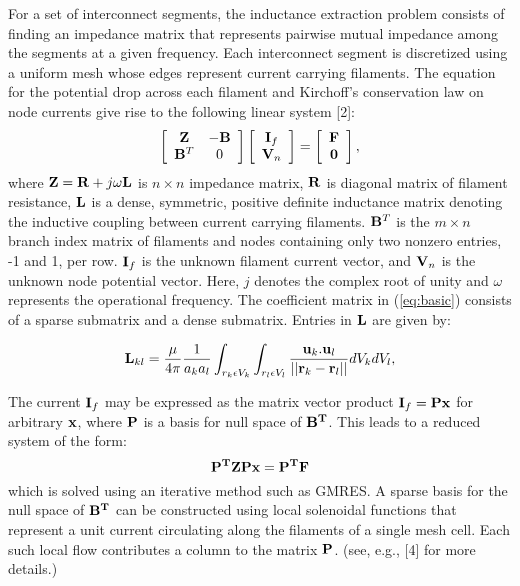 \documentclass{report}
\begin{document}
For a set of interconnect segments, the inductance extraction problem
consists of finding an impedance matrix that represents pairwise mutual
impedance among the segments at a given frequency. Each interconnect
segment is discretized using a uniform mesh whose edges represent current
carrying filaments. The equation for the potential drop across each
filament and Kirchoff's conservation law on node currents give rise to
the following linear system [2]:
\begin{equation}
\label{eq:basic}
\left[\begin{array}
{c c} {\bf Z} & -{\bf B}\\
{\bf B}^{T} & 0 \end{array} \right ]
\left[\begin{array}
{c}{\bf I}_f \\ {\bf V}_n
\end{array}
\right]
=
\left[\begin{array}
{c}{\bf F} \\
{\bf 0}
\end{array}
\right] ,
\end{equation}
where ${\bf Z} = {\bf R} + j\omega{\bf L}$ is $n \times n$ impedance
matrix, ${\bf R}$ is diagonal matrix of filament resistance, ${\bf L}$ is
a dense, symmetric, positive definite inductance matrix denoting the
inductive coupling between current carrying filaments. ${\bf B}^T$ is the
$m \times n$ branch index matrix of filaments and nodes containing only
two nonzero entries, -1 and 1, per row. ${\bf I}_f$ is the unknown
filament current vector, and ${\bf V}_n$ is the unknown node potential
vector. Here, $j$ denotes the complex root of unity and $\omega$
represents the operational frequency. The coefficient matrix in
(\ref{eq:basic}) consists of a sparse submatrix and a dense submatrix.
Entries in ${\bf L}$ are given by:

$$
{\bf L}_{kl}
=\frac{\mu}{4\pi}\frac{1}{a_{k}a_{l}}\int_{{r_k}\epsilon{V_k}}
\int_{{r_l}\epsilon{V_l}}\frac{{\bf u}_{k}{\bf .}{\bf u}_{l}}{||{\bf
r}_{k}
- {\bf r}_{l} ||} dV_{k}dV_{l},
$$

The current ${\bf I}_f$ may be expressed as the matrix vector product
${\bf I}_f = {\bf Px}$ for arbitrary ${\bf x}$, where ${\bf P}$ is a
basis for null space of ${\bf B^T}$. This leads to a reduced system of
the form:
\begin{equation}
\label{eq:reduced_system}
{\bf P^TZPx} = {\bf P^TF}
\end{equation}
which is solved using an iterative method such as GMRES. A sparse basis
for the null space of ${\bf B^T}$ can be constructed using local
solenoidal functions that represent a unit current circulating along the
filaments of a single mesh cell. Each such local flow contributes a
column to the matrix ${\bf P}$. (see, e.g., [4] for more details.)
\end{document}
